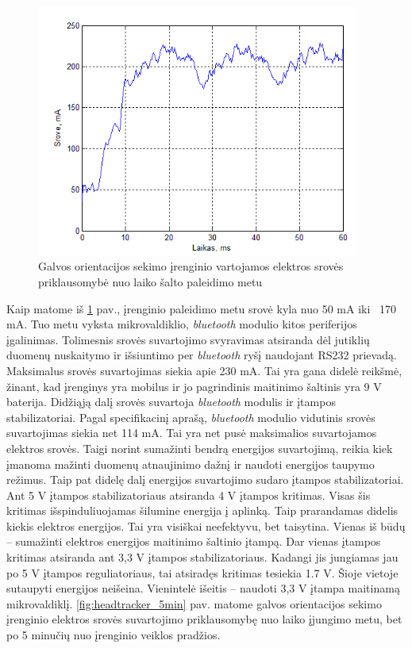\documentclass[]{vgtuef}
\begin{document}
\begin{figure}[htbp]
  \centering
  \includegraphics[width=400px]{img/head_tracker_coldboot.png}
  \caption{Galvos orientacijos sekimo įrenginio vartojamos elektros srovės priklausomybė nuo laiko šalto paleidimo metu}
  \label{fig:headtracker_coldboot}
\end{figure}

Kaip matome iš \ref{fig:headtracker_coldboot} pav., įrenginio paleidimo metu srovė kyla nuo 50 mA iki ~170 mA. Tuo metu vyksta mikrovaldiklio, \textit{bluetooth} modulio kitos periferijos įgalinimas. Tolimesnis srovės suvartojimo svyravimas atsiranda dėl jutiklių duomenų nuskaitymo ir išsiuntimo per \textit{bluetooth} ryšį naudojant RS232 prievadą. Maksimalus srovės suvartojimas siekia apie 230 mA. Tai yra gana didelė reikšmė, žinant, kad įrenginys yra mobilus ir jo pagrindinis maitinimo šaltinis yra 9 V baterija. Didžiąją dalį srovės suvartoja \textit{bluetooth} modulis ir įtampos stabilizatoriai. Pagal specifikacinį aprašą, \textit{bluetooth} modulio vidutinis srovės suvartojimas siekia net 114 mA. Tai yra net pusė maksimalios suvartojamos elektros srovės. Taigi norint sumažinti bendrą energijos suvartojimą, reikia kiek įmanoma mažinti duomenų atnaujinimo dažnį ir naudoti energijos taupymo režimus. Taip pat didelę dalį energijos suvartojimo sudaro įtampos stabilizatoriai. Ant 5 V įtampos stabilizatoriaus atsiranda 4 V įtampos kritimas. Visas šis kritimas išspinduliuojamas šilumine energija į aplinką. Taip prarandamas didelis kiekis elektros energijos. Tai yra visiškai neefektyvu, bet taisytina. Vienas iš būdų – sumažinti elektros energijos maitinimo šaltinio įtampą. Dar vienas įtampos kritimas atsiranda ant 3,3 V įtampos stabilizatoriaus. Kadangi jis jungiamas jau po 5 V įtampos reguliatoriaus, tai atsiradęs kritimas tesiekia 1.7 V. Šioje vietoje sutaupyti energijos neišeina. Vienintelė išeitis – naudoti 3,3 V įtampa maitinamą mikrovaldiklį. \ref{fig:headtracker_5min} pav. matome galvos orientacijos sekimo įrenginio elektros srovės suvartojimo priklausomybę nuo laiko įjungimo metu, bet po 5 minučių nuo įrenginio veiklos pradžios.
\end{document}
